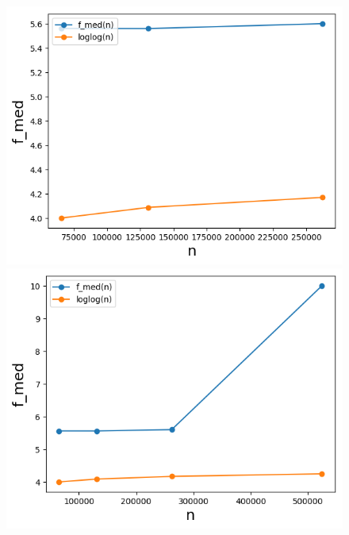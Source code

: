 \begin{figure}[H]
	\hspace*{-.6cm}
    \begin{minipage}[t]{.30\textwidth}
        \centering
		\includegraphics[width=\textwidth]{pictures/med_algo_theo28_med}
    \end{minipage}
    \hspace*{.4cm}
    \begin{minipage}[t]{.30\textwidth}
        \centering
        \includegraphics[width=\textwidth]{pictures/med_algo_theo28_med_jump}
    \end{minipage}

\end{figure}
